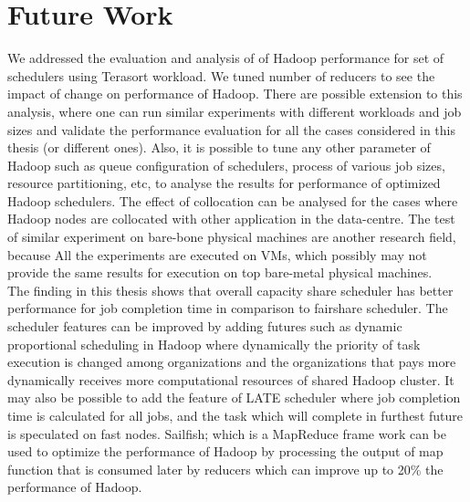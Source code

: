 \section{Future Work}

 We addressed the evaluation and analysis of of Hadoop performance for set of schedulers using Terasort workload. We tuned number of reducers to see the impact of change on performance of Hadoop. There are possible extension to this analysis, where one can run similar experiments with different workloads and job sizes and validate the performance evaluation for all the cases considered in this thesis (or different ones). Also, it is possible to tune any other parameter of Hadoop such as queue configuration of schedulers, process of various job sizes, resource partitioning, etc, to analyse the results for performance of optimized Hadoop schedulers. The effect of collocation can be analysed for the cases where Hadoop nodes are collocated with other application in the data-centre. The test of similar experiment on bare-bone physical machines are another research field, because All the experiments are executed on VMs, which possibly may not provide the same results for execution on top bare-metal physical machines.\\
 
 The finding in this thesis shows that overall capacity share scheduler has better performance for job completion time in comparison to fairshare scheduler. The scheduler features can be improved by adding futures such as dynamic proportional scheduling in Hadoop \cite{dynamic} where  dynamically the priority of task execution is changed among organizations and the organizations that pays more dynamically receives more computational resources of shared Hadoop cluster. It may also be possible to add the feature of LATE scheduler where job completion time is calculated for all jobs, and the task which will complete in furthest future is speculated on fast nodes. Sailfish; \cite{sailfish} which is a MapReduce frame work can be used to optimize the performance of Hadoop by processing the output of map function that is consumed later by reducers which can improve up to 20\% the performance of Hadoop.  \\



